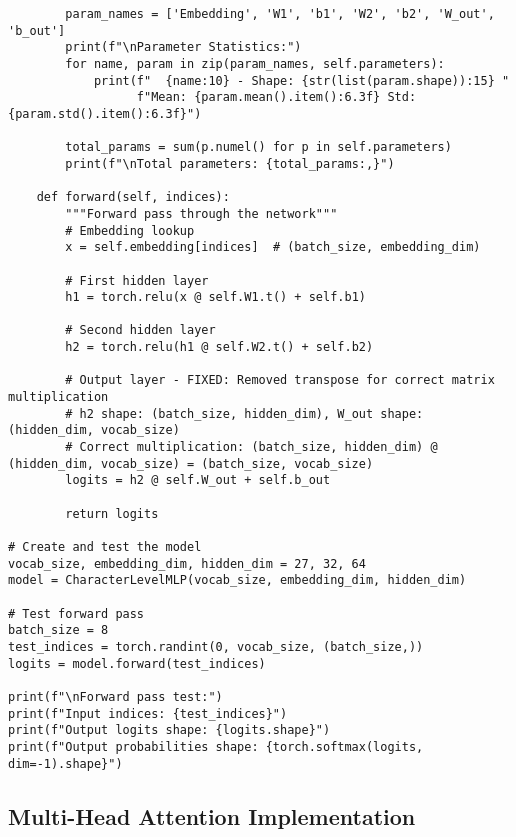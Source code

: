 \documentclass[11pt,a4paper]{book}
\begin{document}
\begin{verbatim}
        param_names = ['Embedding', 'W1', 'b1', 'W2', 'b2', 'W_out', 'b_out']
        print(f"\nParameter Statistics:")
        for name, param in zip(param_names, self.parameters):
            print(f"  {name:10} - Shape: {str(list(param.shape)):15} "
                  f"Mean: {param.mean().item():6.3f} Std: {param.std().item():6.3f}")
        
        total_params = sum(p.numel() for p in self.parameters)
        print(f"\nTotal parameters: {total_params:,}")
    
    def forward(self, indices):
        """Forward pass through the network"""
        # Embedding lookup
        x = self.embedding[indices]  # (batch_size, embedding_dim)
        
        # First hidden layer
        h1 = torch.relu(x @ self.W1.t() + self.b1)
        
        # Second hidden layer
        h2 = torch.relu(h1 @ self.W2.t() + self.b2)
        
        # Output layer - FIXED: Removed transpose for correct matrix multiplication
        # h2 shape: (batch_size, hidden_dim), W_out shape: (hidden_dim, vocab_size)
        # Correct multiplication: (batch_size, hidden_dim) @ (hidden_dim, vocab_size) = (batch_size, vocab_size)
        logits = h2 @ self.W_out + self.b_out
        
        return logits

# Create and test the model
vocab_size, embedding_dim, hidden_dim = 27, 32, 64
model = CharacterLevelMLP(vocab_size, embedding_dim, hidden_dim)

# Test forward pass
batch_size = 8
test_indices = torch.randint(0, vocab_size, (batch_size,))
logits = model.forward(test_indices)

print(f"\nForward pass test:")
print(f"Input indices: {test_indices}")
print(f"Output logits shape: {logits.shape}")
print(f"Output probabilities shape: {torch.softmax(logits, dim=-1).shape}")
\end{verbatim}

\subsection{Multi-Head Attention Implementation}
\end{document}
